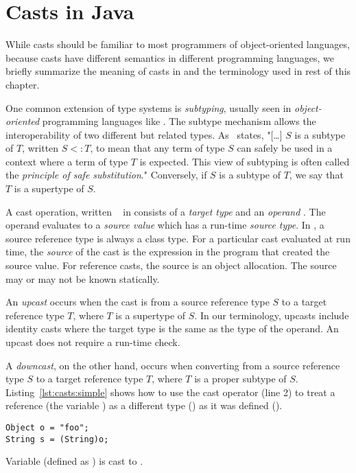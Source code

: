 \section{Casts in Java}
\label{sec:casts:casts}

While casts should be familiar to most programmers of object-oriented languages, 
because casts have different semantics in different programming languages,
we briefly summarize the meaning of casts in \java{} and the terminology used in rest of this chapter.

One common extension of type systems is \emph{subtyping},
usually seen in \emph{object-oriented} programming languages like \java{}.
The subtype mechanism allows the interoperability of two different but related types.
As~\cite{pierceTypesProgrammingLanguages2002} states,
"[\ldots] $S$ is a subtype of $T$, written $S <: T$,
to mean that any term of type $S$ can safely be used in a context where a term of type $T$ is expected.
This view of subtyping is often called the \emph{principle of safe substitution}."
Conversely, if $S$ is a subtype of $T$, we say that $T$ is a supertype of $S$.

A cast operation, written ~ in \java{}
consists of a \emph{target type}  and an \emph{operand} .
The operand evaluates to a \emph{source value} which has a run-time
\emph{source type}.
In \java{}, a source reference type is always a class type.
For a particular cast evaluated at run time, 
the \emph{source} of the cast is the expression in the program that
created the source value.
For reference casts, the source is an object allocation.
The source may or may not be known statically.

An \emph{upcast} occurs when the cast is from a source reference type $S$ to a target reference type $T$,
where $T$ is a supertype of $S$.
In our terminology, upcasts include identity casts where the target type
is the same as the type of the operand.
An upcast does not require a run-time check.

A \emph{downcast}, on the other hand,
occurs when converting from a source reference type $S$ to a target reference
type $T$, where $T$ is a proper subtype of $S$.
Listing~\ref{lst:casts:simple} shows how to use the cast operator (line 2) to treat a reference (the variable ) as a different type () as it was defined ().

\begin{listing}[H]
\begin{verbatim}
Object o = "foo"; 
String s = (String)o;
\end{verbatim}
\caption{Variable  (defined as ) is cast to .}
\label{lst:casts:simple}
\end{listing}

